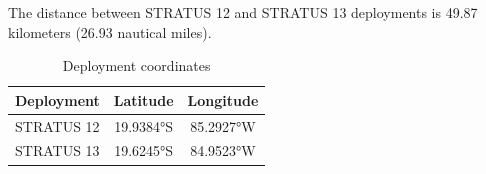 
The distance between STRATUS 12 and STRATUS 13 deployments is 49.87 kilometers (26.93 nautical miles).

\begin{table}[ht]
\centering
\caption{Deployment coordinates}
\begin{tabular}{lcc}
\hline
\textbf{Deployment} & \textbf{Latitude} & \textbf{Longitude} \\
\hline
STRATUS 12 & 19.9384°S & 85.2927°W \\
STRATUS 13 & 19.6245°S & 84.9523°W \\
\hline
\end{tabular}
\end{table}
